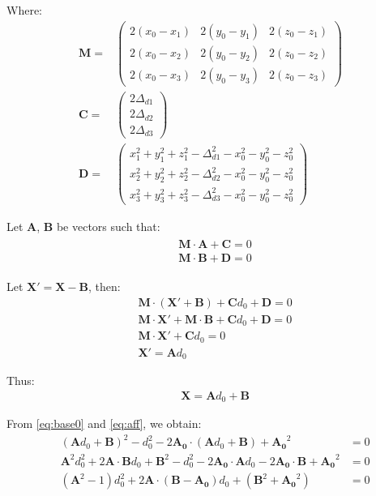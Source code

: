 \documentclass[12pt,a4paper,fleqn]{report}
\begin{document}
\begin{appendices}
{Where:
\begin{align*}
	\mathbf{M} = &
	\begin{pmatrix}
		2 (x_0 - x_1) & 2 (y_0 - y_1) & 2 (z_0 - z_1) \\
		2 (x_0 - x_2) & 2 (y_0 - y_2) & 2 (z_0 - z_2) \\
		2 (x_0 - x_3) & 2 (y_0 - y_3) & 2 (z_0 - z_3)
	\end{pmatrix} \\
	\mathbf{C} = &
	\begin{pmatrix}
		2 \Delta_{d1} \\ 2 \Delta_{d2} \\ 2 \Delta_{d3}
	\end{pmatrix} \\
	\mathbf{D} = &
	\begin{pmatrix}
		x_1^2 + y_1^2 + z_1^2 - \Delta_{d1}^2 - x_0^2 - y_0^2 - z_0^2 \\
		x_2^2 + y_2^2 + z_2^2 - \Delta_{d2}^2 - x_0^2 - y_0^2 - z_0^2 \\
		x_3^2 + y_3^2 + z_3^2 - \Delta_{d3}^2 - x_0^2 - y_0^2 - z_0^2
	\end{pmatrix}
\end{align*}

Let $\mathbf{A}$, $\mathbf{B}$ be vectors such that:
\begin{align}
	\begin{split}
		& \mathbf{M} \cdot \mathbf{A} + \mathbf{C} = 0 \\
		& \mathbf{M} \cdot \mathbf{B} + \mathbf{D} = 0
	\end{split} \label{eq:2lin}
\end{align}

Let $\mathbf{X'} = \mathbf{X} - \mathbf{B}$, then:
\begin{align*}
	& \mathbf{M} \cdot (\mathbf{X'} + \mathbf{B}) + \mathbf{C} d_0 + \mathbf{D} = 0 \nonumber \\
	& \mathbf{M} \cdot \mathbf{X'} + \mathbf{M} \cdot \mathbf{B} + \mathbf{C} d_0 + \mathbf{D} = 0 \nonumber \\
	& \mathbf{M} \cdot \mathbf{X'} + \mathbf{C} d_0 = 0 \nonumber \\
	& \mathbf{X'} = \mathbf{A} d_0
\end{align*}

Thus:
\begin{align}
	& \mathbf{X} = \mathbf{A} d_0 + \mathbf{B} \label{eq:aff}
\end{align}

From \eqref{eq:base0} and \eqref{eq:aff}, we obtain:
\begin{align}
	& (\mathbf{A} d_0 + \mathbf{B})^2 - d_0^2 - 2 \mathbf{A_0} \cdot (\mathbf{A} d_0 + \mathbf{B}) + \mathbf{A_0}^2 & = 0 \nonumber \\
	& \mathbf{A}^2 d_0^2 + 2 \mathbf{A} \cdot \mathbf{B} d_0 + \mathbf{B}^2 - d_0^2 - 2 \mathbf{A_0} \cdot \mathbf{A} d_0 - 2 \mathbf{A_0} \cdot \mathbf{B} + \mathbf{A_0}^2 & = 0 \nonumber \\
	& (\mathbf{A}^2 - 1) d_0^2 + 2 \mathbf{A} \cdot (\mathbf{B} - \mathbf{A_0}) d_0 + (\mathbf{B}^2 + \mathbf{A_0}^2) & = 0 \label{eq:quad}
\end{align}

}
\end{appendices}
\end{document}
